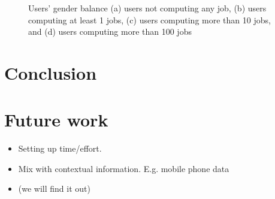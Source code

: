 \documentclass{article}
\begin{document}
\begin{figure}[t]
	\begin{center}
	\end{center}
	\caption{Users' gender balance  (a) users not computing any job, (b) users computing at least 1 jobs, (c) users computing more than 10 jobs, and (d) users computing more than 100 jobs}
	\label{img:genderchallenge}
\end{figure} 
      
    
    
    
%      
%      
%      
%      
%
%
%
%
%










\section{Conclusion}


\section{Future work}

\begin{itemize}
\item Setting up time/effort. 
\item Mix with contextual information. E.g. mobile phone data 
\item (we will find it out)
\end{itemize}





\end{document}
